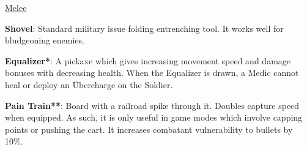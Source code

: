 \newpage

\begin {center}
\underline {Melee}
\end {center}

{\bf Shovel}: Standard military issue folding entrenching tool. It works well for bludgeoning enemies. 

{\bf Equalizer*}: A pickaxe which gives increasing movement speed and damage bonuses with decreasing health. When the Equalizer is drawn, a Medic cannot heal or deploy an Übercharge on the Soldier.

{\bf Pain Train**}: Board with a railroad spike through it. Doubles capture speed when equipped. As such, it is only useful in game modes which involve capping points or pushing the cart. It increases combatant vulnerability to bullets by 10\%.

